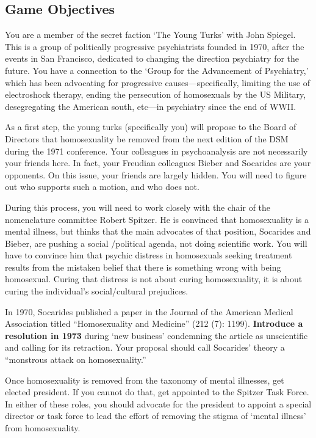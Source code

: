 \begin{refsection}
\section{Game Objectives}
\label{gameobjectives}

You are a member of the secret faction `The Young Turks' with John Spiegel. This is a group of politically progressive psychiatrists founded in 1970, after the events in San Francisco, dedicated to changing the direction psychiatry for the future. You have a connection to the `Group for the Advancement of Psychiatry,' which has been advocating for progressive causes—specifically, limiting the use of electroshock therapy, ending the persecution of homosexuals by the US Military, desegregating the American south, etc—in psychiatry since the end of WWII. 

As a first step, the young turks (specifically you) will propose to the Board of Directors that homosexuality be removed from the next edition of the DSM during the 1971 conference. Your colleagues in psychoanalysis are not necessarily your friends here. In fact, your Freudian colleagues Bieber and Socarides are your opponents. On this issue, your friends are largely hidden. You will need to figure out who supports such a motion, and who does not.

During this process, you will need to work closely with the chair of the nomenclature committee Robert Spitzer. He is convinced that homosexuality is a mental illness, but thinks that the main advocates of that position, Socarides and Bieber, are pushing a social \slash  political agenda, not doing scientific work. You will have to convince him that psychic distress in homosexuals seeking treatment results from the mistaken belief that there is something wrong with being homosexual. Curing that distress is not about curing homosexuality, it is about curing the individual's social\slash cultural prejudices.

In 1970, Socarides published a paper in the Journal of the American Medical Association titled “Homosexuality and Medicine” (212 (7): 1199). \textbf{Introduce a resolution in 1973} during ‘new business’ condemning the article as unscientific and calling for its retraction. Your proposal should call Socarides' theory a “monstrous attack on homosexuality.”

Once homosexuality is removed from the taxonomy of mental illnesses, get elected president. If you cannot do that, get appointed to the Spitzer Task Force. In either of these roles, you should advocate for the president to appoint a special director or task force to lead the effort of removing the stigma of `mental illness' from homosexuality.


\end{refsection}
